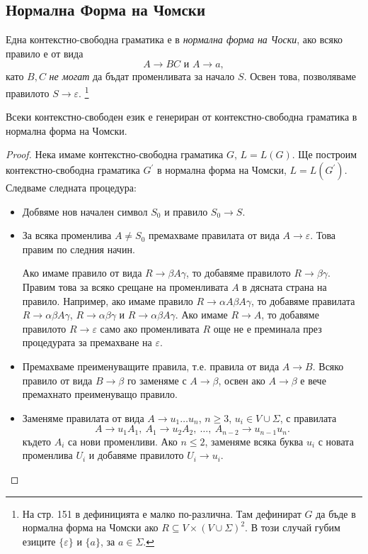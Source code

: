 \subsection{Нормална Форма на Чомски}

\begin{dfn}
Една контекстно-свободна граматика е в {\em нормална форма на Чоски}, ако
всяко правило е от вида
\[A \rightarrow BC\mbox{ и }A \rightarrow a,\]
като $B, C$ {\em не могат} да бъдат променливата за начало $S$.
Освен това, позволяваме правилото $S\to\varepsilon$.
\footnote{На стр. 151 в \cite{papadimitriou} дефиницията е малко по-различна.
Там дефинират $G$ да бъде в нормална форма на Чомски ако $R \subseteq V\times(V\cup\Sigma)^2$.
В този случай губим езиците $\{\varepsilon\}$ и $\{a\}$, за $a\in\Sigma$.}
\end{dfn}

\begin{thm}
  Всеки контекстно-свободен език е генериран от контекстно-свободна
  граматика в нормална форма на Чомски.
\end{thm}
\begin{proof}
  Нека имаме контекстно-свободна граматика $G$, $L = L(G)$.
  Ще построим контекстно-свободна граматика $G^\prime$ в нормална форма на Чомски, $L = L(G^\prime)$.
  Следваме следната процедура:
  \begin{itemize}
  \item
    Добвяме нов начален символ $S_0$ и правило $S_0 \to S$.
  \item
    За всяка променлива $A \neq S_0$ премахваме правилата от вида $A\to\varepsilon$.
    Това правим по следния начин.
    
    Ако имаме правило от вида $R\to \beta A\gamma$, то добавяме правилото $R\to \beta\gamma$.
    Правим това за всяко срещане на променливата $A$ в дясната страна на правило.
    Например, ако имаме правило $R\to \alpha A\beta A \gamma$, то добавяме правилата $R \to \alpha\beta A\gamma$,
    $R\to \alpha\beta\gamma$ и $R\to \alpha\beta A\gamma$.
    Ако имаме $R\to A$, то добавяме правилото $R\to\varepsilon$
    само ако променливата $R$ още не е преминала през процедурата за премахване на $\varepsilon$.
  \item
    Премахваме преименуващите правила, т.е. правила от вида $A\to B$.
    Всяко правило от вида $B \to \beta$ го заменяме с $A\to \beta$,
    освен ако $A \to \beta$ е вече премахнато преименуващо правило.
  \item
    Заменяме правилата от вида $A\to u_1\dots u_n$, $n\geq 3$, $u_i \in V\cup\Sigma$, с
    правилата \[A\to u_1A_1,\ A_1\to u_2A_2,\ \dots,\ A_{n-2} \to u_{n-1}u_n.\]
    където $A_i$ са нови променливи.
    Ако $n\leq 2$, заменяме всяка буква $u_i$ с новата променлива $U_i$
    и добавяме правилото $U_i\to u_i$.
  \end{itemize}
\end{proof}

